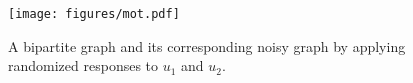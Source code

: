 \begin{figure}[thb]
\centering  
\texttt{[image: figures/mot.pdf]}
\myspace
\caption{
A bipartite graph and its corresponding noisy graph by applying randomized responses to $u_1$ and $u_2$. 
}
\myspace
\myspace
\label{fig:motivation}
\end{figure}